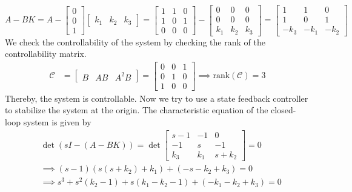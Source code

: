 \begin{equation*}
    A - BK
    =
    A
    -
    \begin{bmatrix}
        0 \\ 0 \\ 1
    \end{bmatrix}
    \begin{bmatrix}
        k_{1} & k_{2} & k_{3}
    \end{bmatrix}
    =
    \begin{bmatrix}
        1 & 1 & 0 \\
        1 & 0 & 1 \\
        0 & 0 & 0
    \end{bmatrix}
    -
    \begin{bmatrix}
        0   & 0   & 0   \\
        0   & 0   & 0   \\
        k_1 & k_2 & k_3
    \end{bmatrix}
    =
    \begin{bmatrix}
        1    & 1    & 0    \\
        1    & 0    & 1    \\
        -k_3 & -k_1 & -k_2
    \end{bmatrix}
\end{equation*}
We check the controllability of the system by checking the rank of the controllability matrix.
\begin{align*}
    \mathcal{C}
     & =
    \begin{bmatrix}
        B & AB & A^{2}B
    \end{bmatrix}
    =
    \begin{bmatrix}
        0 & 0 & 1 \\
        0 & 1 & 0 \\
        1 & 0 & 0
    \end{bmatrix}
    \implies
    \text{rank}(\mathcal{C}) = 3
\end{align*}
Thereby, the system is controllable.
Now we try to use a state feedback controller to stabilize the system at the origin.
The characteristic equation of the closed-loop system is given by
\begin{align*}
     &
    \det(sI-(A-BK))
    =
    \det
    \begin{bmatrix}
        s-1   & -1    & 0       \\
        -1    & s     & -1      \\
        k_{3} & k_{1} & s+k_{2}
    \end{bmatrix}
    =
    0
    \\ &
    \implies
    (s-1)(s(s+k_2) + k_1) + (-s-k_2 + k_3) = 0
    \\ &
    \implies
    s^3 + s^2 (k_2 - 1) + s (k_1 - k_2 - 1) + (-k_1 - k_2 + k_3) = 0
\end{align*}
